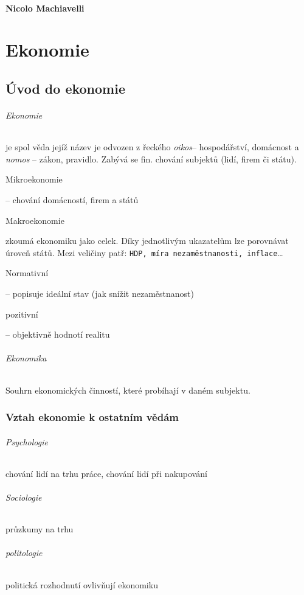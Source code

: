 \documentclass[10pt,a4paper,
twoside,%
]{report}
\begin{document}
\subsection{Nicolo Machiavelli}



\part{Ekonomie}

\chapter{Úvod do ekonomie}


\paragraph{Ekonomie} je spol věda jejíž název je odvozen z řeckého \emph{oikos}-- hospodářství, domácnost a \emph{nomos} -- zákon, pravidlo. Zabývá se fin. chování subjektů (lidí, firem či státu).
\subparagraph{Mikroekonomie} -- chování  domácností, firem a států

\subparagraph{Makroekonomie} zkoumá ekonomiku jako celek. Díky jednotlivým ukazatelům lze porovnávat úroveň států. Mezi veličiny patř: \texttt{HDP, míra nezaměstnanosti, inflace}\dots

\subparagraph{Normativní} -- popisuje ideální stav (jak snížit nezaměstnanost)

\subparagraph{pozitivní} -- objektivně hodnotí realitu

\paragraph{Ekonomika} Souhrn ekonomických činností, které probíhají v daném subjektu.
\section{Vztah ekonomie k ostatním vědám}
\paragraph{Psychologie} chování lidí na trhu práce, chování lidí při nakupování

\paragraph{Sociologie} průzkumy na trhu

\paragraph{politologie} politická rozhodnutí ovlivňují ekonomiku
\end{document}
